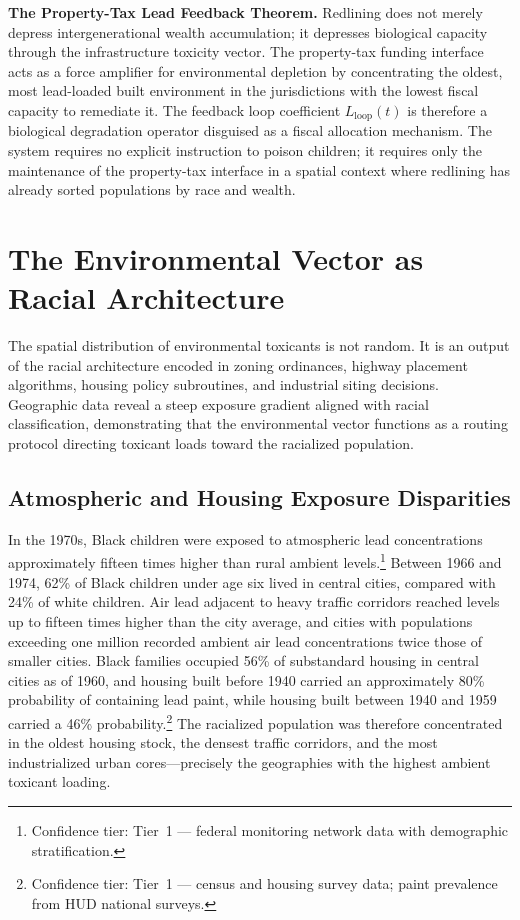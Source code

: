 \begin{keyinsight}
\textbf{The Property-Tax Lead Feedback Theorem.} Redlining does not merely
depress intergenerational wealth accumulation; it depresses biological capacity
through the infrastructure toxicity vector. The property-tax funding interface
acts as a force amplifier for environmental depletion by concentrating the
oldest, most lead-loaded built environment in the jurisdictions with the lowest
fiscal capacity to remediate it. The feedback loop coefficient $L_{\text{loop}}(t)$
is therefore a biological degradation operator disguised as a fiscal allocation
mechanism. The system requires no explicit instruction to poison children; it
requires only the maintenance of the property-tax interface in a spatial context
where redlining has already sorted populations by race and wealth.
\end{keyinsight}

\section{The Environmental Vector as Racial Architecture}

The spatial distribution of environmental toxicants is not random. It is an
output of the racial architecture encoded in zoning ordinances, highway placement
algorithms, housing policy subroutines, and industrial siting decisions.
Geographic data reveal a steep exposure gradient aligned with racial
classification, demonstrating that the environmental vector functions as a
routing protocol directing toxicant loads toward the racialized population.

\subsection{Atmospheric and Housing Exposure Disparities}

In the 1970s, Black children were exposed to atmospheric lead concentrations
approximately fifteen times higher than rural ambient levels.\footnote{Confidence tier: Tier~1 --- federal monitoring
network data with demographic stratification.} Between 1966 and 1974, 62\% of
Black children under age six lived in central cities, compared with 24\% of white
children. Air lead adjacent to heavy traffic corridors reached levels up to
fifteen times higher than the city average, and cities with populations exceeding
one million recorded ambient air lead concentrations twice those of smaller
cities. Black families occupied 56\% of substandard housing in central cities as
of 1960, and housing built before 1940 carried an approximately 80\% probability
of containing lead paint, while housing built between 1940 and 1959 carried a
46\% probability.\footnote{Confidence tier: Tier~1 --- census and housing survey
data; paint prevalence from HUD national surveys.} The racialized population was
therefore concentrated in the oldest housing stock, the densest traffic corridors,
and the most industrialized urban cores---precisely the geographies with the
highest ambient toxicant loading.

